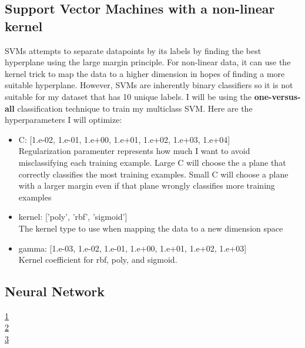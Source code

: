 \documentclass[12pt]{article}
\newcommand{\nextproblem}{
	\vfill
	\pagebreak
}
\begin{document}
\subsection{Support Vector Machines with a non-linear kernel}
SVMs attempts to separate datapoints by its labels by finding the best hyperplane using the large margin principle. For non-linear data, it can use the kernel trick to map the data to a higher dimension in hopes of finding a more suitable hyperplane. However, SVMs are inherently binary classifiers so it is not suitable for my dataset that has 10 unique labels. I will be using the \textbf{one-versus-all} classification technique to train my multiclass SVM. Here are the hyperparameters I will optimize:
\begin{itemize}
    \item C: [1.e-02, 1.e-01, 1.e+00, 1.e+01, 1.e+02, 1.e+03, 1.e+04]
    \\ Regularization paramenter represents how much I want to avoid misclassifying each training example. Large C will choose the a plane that correctly classifies the most training examples. Small C will choose a plane with a larger margin even if that plane wrongly classifies more training examples
    \item kernel: ['poly', 'rbf', 'sigmoid'] 
    \\ The kernel type to use when mapping the data to a new dimension space
    \item gamma: [1.e-03, 1.e-02, 1.e-01, 1.e+00, 1.e+01, 1.e+02, 1.e+03]
    \\ Kernel coefficient for rbf, poly, and sigmoid.
\end{itemize}

\subsection{Neural Network}


\nextproblem

\href{https://www.quora.com/What-are-C-and-gamma-with-regards-to-a-support-vector-machine}{1} \\
\href{https://scikit-learn.org/stable/auto_examples/svm/plot_rbf_parameters.html}{2} \\
\href{https://machinelearningmastery.com/save-load-machine-learning-models-python-scikit-learn/}{3} \\
\end{document}
